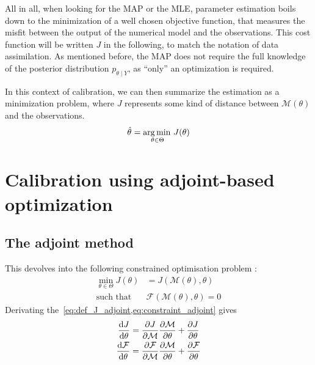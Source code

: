 \documentclass[../../Main_ManuscritThese.tex]{subfiles}
\begin{document}
All in all, when looking for the MAP or the MLE, parameter estimation boils down to the minimization of a well chosen objective function, that measures the misfit between the output of the numerical model and the observations. This cost function will be written $J$ in the following, to match the notation of data assimilation. As mentioned before, the MAP does not require the full knowledge of the posterior distribution $p_{\theta \mid Y}$, as ``only'' an optimization is required.

In this context of calibration, we can then summarize the estimation as a minimization problem, where $J$ represents some kind of distance between $\mathcal{M}(\theta)$ and the observations.
\begin{equation}
  \hat{\theta}_{\mathrm{}} = \operatorname*{arg\,min \,}_{\theta\in \Theta} J(\theta)
\end{equation}

\section{Calibration using adjoint-based optimization}

\subsection{The adjoint method}
This devolves into the following constrained optimisation problem :
\begin{align}
  \min_{\theta \in \Theta} J(\theta) &= J(\mathcal{M}(\theta), \theta) \label{eq:def_J_adjoint}\\
  \text{such that } &\mathcal{F}(\mathcal{M}(\theta), \theta) = 0 \label{eq:constraint_adjoint}
\end{align}
Derivating the~\cref{eq:def_J_adjoint,eq:constraint_adjoint} gives
\begin{align}
  \frac{\mathrm{d}J}{\mathrm{d}\theta} &= \frac{\partial J}{\partial \mathcal{M}} \frac{\partial \mathcal{M}}{\partial \theta} + \frac{\partial J}{\partial \theta}\\
  \frac{\mathrm{d}\mathcal{F}}{\mathrm{d}\theta} &= \frac{\partial \mathcal{F}}{\partial \mathcal{M}} \frac{\partial \mathcal{M}}{\partial \theta} + \frac{\partial \mathcal{F}}{\partial \theta}
\end{align}
\end{document}
